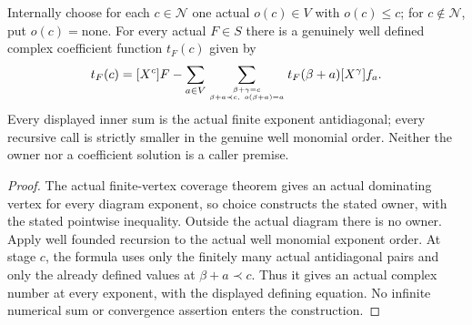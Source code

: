 \begin{lemma}
\label{hir:actual-formal-vertex-owner-coefficient-recursion}
Internally choose for each $c\in\mathcal N$ one actual $o(c)\in V$ with
$o(c)\le c$; for $c\notin\mathcal N$, put $o(c)=\mathrm{none}$.
For every actual $F\in S$ there is a genuinely well defined complex
coefficient function $t_F(c)$ given by
\[
 t_F(c)=[X^c]F-
 \sum_{a\in V}\sum_{\beta+\gamma=c\atop\beta+a\prec c,\ o(\beta+a)=a}
 t_F(\beta+a)[X^\gamma]f_a .
\]
Every displayed inner sum is the actual finite exponent antidiagonal;
every recursive call is strictly smaller in the genuine well monomial
order. Neither the owner nor a coefficient solution is a caller premise.
\leanok
\end{lemma}
\begin{proof}
The actual finite-vertex coverage theorem gives an actual dominating
vertex for every diagram exponent, so choice constructs the stated
owner, with the stated pointwise inequality. Outside the actual diagram
there is no owner. Apply well founded recursion to the actual well
monomial exponent order. At stage $c$, the formula uses only the finitely
many actual antidiagonal pairs and only the already defined values at
$\beta+a\prec c$. Thus it gives an actual complex number at every
exponent, with the displayed defining equation. No infinite numerical
sum or convergence assertion enters the construction.
\end{proof}

